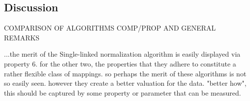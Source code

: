 \documentclass{article}
\newtheorem{definition}{Definition}
\newcommand{\args}{\mathcal{A}} %
\newcommand{\att}{\mathcal{R}}  %
\newcommand{\valueset}{L}
\newcommand{\safid}{F}               %
\newcommand{\saf}{\safid = \safbody} %
\newcommand{\safbody}{\langle \args, \att, V \rangle} %
\newcommand{\sembodyNew}{\left\langle \valueset,\SAFand_\mathcal{A}, \SAFand_\mathcal{R},\SAFor,\lnot,\tau \right\rangle} %
\newcommand{\SAFand}{\curlywedge}     %
\newcommand{\SAFor}{\curlyvee}        %
\newcommand{\sem}{\mathcal{S}}
\newcommand{\dataset}{\mathcal{D}}   %
\begin{document}
\subsection{Discussion}

COMPARISON OF ALGORITHMS COMP/PROP AND GENERAL REMARKS

...the merit of the Single-linked normalization algorithm is easily displayed via property 6. for the other two, the properties that they adhere to constitute a rather flexible class of mappings. so perhaps the merit of these algorithms is not so easily seen. however they create a better valuation for the data. "better how", this should be captured by some property or parameter that can be measured. 



\begin{comment} %

\subsection{Classes of Normalizing Mappings}

Here we define some concrete classes of normalizing mappings which all adhere to a subset of desired properties defined in the previous section. 

The purpose of this section is just to display that different envisioned uses may require functions that satisfy different collections of properties. 

\begin{definition} [Perfect normalizing mapping] Given a SAF $\saf$ and a semantic framework $\sem = \sembodyNew$,  an injective mapping $\sigma_{\dataset}: \dataset  \rightarrow  [0,1]$ is a perfect normalizing mapping if $\sigma$ adheres to Properties 1, 2, 3, 4, 5 and 6.
\end{definition}

Property 3 emphasizes the importance of the popular opinion. It carries great significance when defining the formal backbones of the framework. However we may choose to allow the normalized values to go beyond the social support values on the GUI part, with the goal of a more clear display of the argumentation graph. Thus we may choose to not require the particular function to hold for Property 3.

\begin{definition} [GUI-friendly normalizing mapping] Given a SAF $\saf$ and a semantic framework $\sem = \sembodyNew$,  an injective mapping $\sigma_{\dataset}: \dataset  \rightarrow  [0,1]$ is a perfect normalizing mapping if $\sigma$ adheres to Properties 1, 2, 4, 5 and 6.
\end{definition}


\end{comment}
\end{document}
